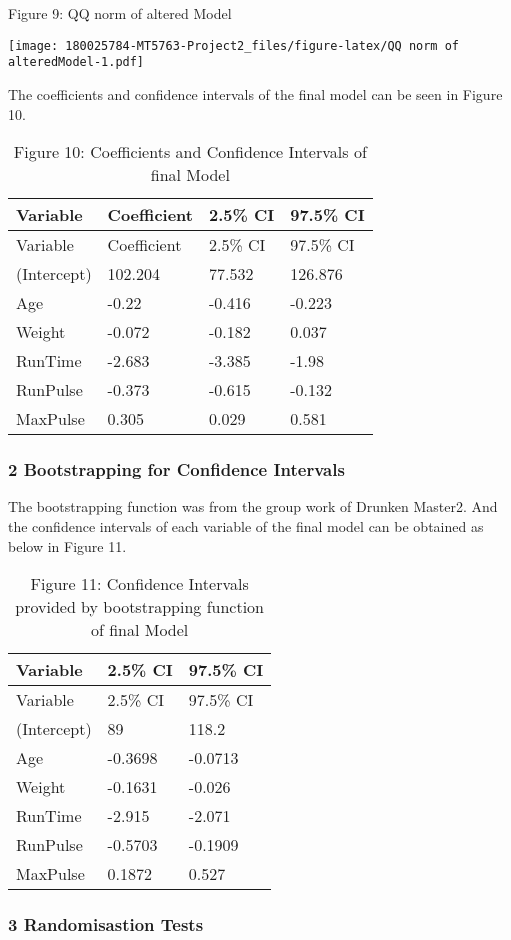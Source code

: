 \documentclass[]{article}
\begin{document}
Figure 9: QQ norm of altered Model

\texttt{[image: 180025784-MT5763-Project2\_files/figure-latex/QQ norm of alteredModel-1.pdf]}

The coefficients and confidence intervals of the final model can be seen
in Figure 10.

\begin{longtable}[]{@{}llll@{}}
\caption{Figure 10: Coefficients and Confidence Intervals of final
Model}\tabularnewline
\toprule
Variable & Coefficient & 2.5\% CI & 97.5\% CI\tabularnewline
\midrule
\endfirsthead
\toprule
Variable & Coefficient & 2.5\% CI & 97.5\% CI\tabularnewline
\midrule
\endhead
(Intercept) & 102.204 & 77.532 & 126.876\tabularnewline
Age & -0.22 & -0.416 & -0.223\tabularnewline
Weight & -0.072 & -0.182 & 0.037\tabularnewline
RunTime & -2.683 & -3.385 & -1.98\tabularnewline
RunPulse & -0.373 & -0.615 & -0.132\tabularnewline
MaxPulse & 0.305 & 0.029 & 0.581\tabularnewline
\bottomrule
\end{longtable}

\pagebreak

\subsubsection{2 Bootstrapping for Confidence
Intervals}\label{bootstrapping-for-confidence-intervals}

The bootstrapping function was from the group work of Drunken Master2.
And the confidence intervals of each variable of the final model can be
obtained as below in Figure 11.

\begin{longtable}[]{@{}lll@{}}
\caption{Figure 11: Confidence Intervals provided by bootstrapping
function of final Model}\tabularnewline
\toprule
Variable & 2.5\% CI & 97.5\% CI\tabularnewline
\midrule
\endfirsthead
\toprule
Variable & 2.5\% CI & 97.5\% CI\tabularnewline
\midrule
\endhead
(Intercept) & 89 & 118.2\tabularnewline
Age & -0.3698 & -0.0713\tabularnewline
Weight & -0.1631 & -0.026\tabularnewline
RunTime & -2.915 & -2.071\tabularnewline
RunPulse & -0.5703 & -0.1909\tabularnewline
MaxPulse & 0.1872 & 0.527\tabularnewline
\bottomrule
\end{longtable}

\pagebreak

\subsubsection{3 Randomisastion Tests}\label{randomisastion-tests}
\end{document}
